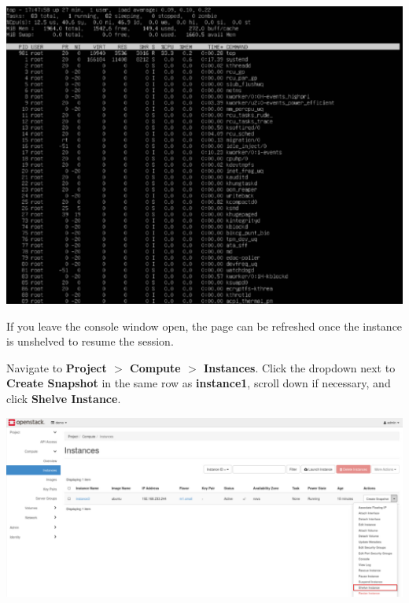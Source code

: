 \documentclass[letterpaper, 12pt]{article}
\begin{document}
\begin{enumerate}
\begin{labstep}
        \begin{center}
            \includegraphics[width=\linewidth]{images/part5/step9.png}
        \end{center}
    \end{labstep}

    \begin{tipbox}
        If you leave the console window open, the page can be refreshed once the instance is unshelved to resume the session.
    \end{tipbox}

    \begin{labstep}
        Navigate to \textbf{Project $>$ Compute $>$ Instances}.
        Click the dropdown next to \textbf{Create Snapshot} in the same row as \textbf{instance1}, scroll down if necessary, and click \textbf{Shelve Instance}.

        \begin{center}
            \includegraphics[width=\linewidth]{images/part5/step10.png}
        \end{center}
    \end{labstep}


\end{enumerate}
\end{document}
